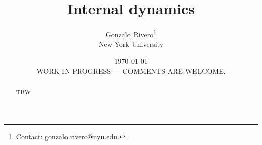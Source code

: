\documentclass[11pt]{article}
\begin{document}
\title{Internal dynamics}

\author{\href{mailto:gonzalo.rivero@nyu.edu}{Gonzalo Rivero}\footnote{Contact:
    \href{mailto:gonzalo.rivero@nyu.edu}{gonzalo.rivero@nyu.edu}.} \\ New York University
}

\date{\today \\ \vspace*{2cm}  WORK IN PROGRESS --- COMMENTS ARE WELCOME.}

\maketitle


\begin{abstract}
TBW
\end{abstract}

\newpage



% 
% 
% 

\newpage

% 
% 
\end{document}
